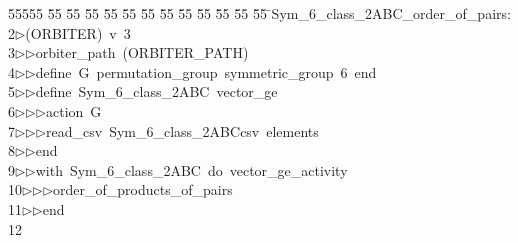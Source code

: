 %
%
\begin{tabbing}
55555 \= 55 \= 55 \= 55 \= 55 \= 55 \= 55 \= 55 \= 55 \= 55 \= 55 \= 55 \= 55 \= \>Sym\_6\_class\_2ABC\_order\_of\_pairs:\\[0pt]
2\>$\triangleright$\>(ORBITER)\ v\ 3\ \\[0pt]
3\>$\triangleright$\>$\triangleright$\>orbiter\_path\ (ORBITER\_PATH)\ \\[0pt]
4\>$\triangleright$\>$\triangleright$\>define\ G\ permutation\_group\ symmetric\_group\ 6\ end\ \\[0pt]
5\>$\triangleright$\>$\triangleright$\>define\ Sym\_6\_class\_2ABC\ vector\_ge\ \\[0pt]
6\>$\triangleright$\>$\triangleright$\>$\triangleright$\>action\ G\ \\[0pt]
7\>$\triangleright$\>$\triangleright$\>$\triangleright$\>read\_csv\ Sym\_6\_class\_2ABCcsv\ elements\ \\[0pt]
8\>$\triangleright$\>$\triangleright$\>end\ \\[0pt]
9\>$\triangleright$\>$\triangleright$\>with\ Sym\_6\_class\_2ABC\ do\ vector\_ge\_activity\ \\[0pt]
10\>$\triangleright$\>$\triangleright$\>$\triangleright$\>order\_of\_products\_of\_pairs\ \\[0pt]
11\>$\triangleright$\>$\triangleright$\>end\ \\[0pt]
12\>\end{tabbing}
